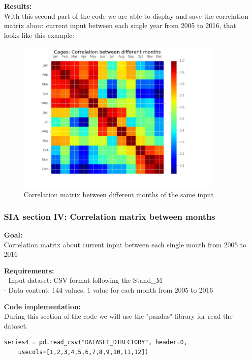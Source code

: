 \begin{minipage}{0.5\textwidth}
\textbf{Results:} \\
With this second part of the code we are able to display and save the correlation matrix about current input between each single year from 2005 to 2016, that looks like this example:
\end{minipage} \hfill
\begin{minipage}{0.45\textwidth}
\begin{figure}[H]
    \includegraphics[width=0.9\textwidth]{Files/Cages_Months_Matrix.jpg}
    \caption{Correlation matrix between different months of the same input}
\end{figure}
\end{minipage}



\newpage
\subsubsection{SIA section IV: Correlation matrix between months}

\textbf{Goal:}\\
Correlation matrix about current input between each single month from 2005 to 2016

\textbf{Requirements:}\\
- Input dataset: CSV format following the Stand\_M \\
- Data content: 144 values, 1 value for each month from 2005 to 2016

\textbf{Code implementation:}\\
During this section of the code we will use the "pandas" library for read the dataset.
\begin{lstlisting}
series4 = pd.read_csv("DATASET_DIRECTORY", header=0, 
	usecols=[1,2,3,4,5,6,7,8,9,10,11,12])
\end{lstlisting}

